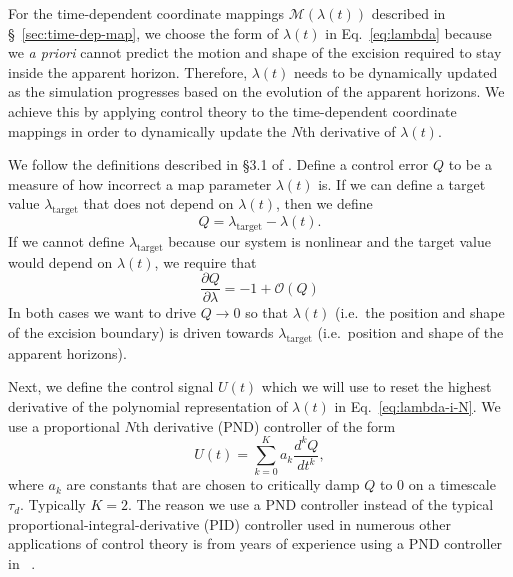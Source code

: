 \begin{bibunit}[unsrtnat]
For the time-dependent coordinate mappings $\mathcal{M}(\lambda(t))$ described
in \S~\ref{sec:time-dep-map}, we choose the form of $\lambda(t)$ in
Eq.~\eqref{eq:lambda} because we \textit{a priori} cannot predict the motion and
shape of the excision required to stay inside the apparent horizon. Therefore,
$\lambda(t)$ needs to be dynamically updated as the simulation progresses based
on the evolution of the apparent horizons. We achieve this by applying control
theory to the time-dependent coordinate mappings in order to dynamically update
the $N$th derivative of $\lambda(t)$.

We follow the definitions described in \S 3.1 of \cite{Hemberger:2012jz}. Define
a control error $Q$ to be a measure of how incorrect a map parameter
$\lambda(t)$ is.
If we can define a target value $\lambda_{\textrm{target}}$ that
does not depend on $\lambda(t)$, then we define
\begin{equation}
  \label{eq:control-error-linear}
  Q = \lambda_{\textrm{target}} - \lambda(t).
\end{equation}
If we cannot define $\lambda_{\textrm{target}}$ because our system is nonlinear
and the target value would depend on $\lambda(t)$, we require that
\begin{equation}
  \label{eq:control-error-nonlinear}
  \frac{\partial Q}{\partial \lambda} = -1 + \mathcal{O}(Q)
\end{equation}
In both cases we want to drive $Q\rightarrow 0$ so that $\lambda(t)$ (i.e.~the
position and shape of the excision boundary) is driven towards
$\lambda_\textrm{target}$ (i.e.~position and shape of the apparent horizons).

Next, we define the control signal $U(t)$ which we will use to reset the highest
derivative of the polynomial representation of $\lambda(t)$ in
Eq.~\eqref{eq:lambda-i-N}. We use a proportional $N$th derivative (PND)
controller of the form
\begin{equation}
  \label{eq:control-signal}
  U(t) = \sum_{k=0}^{K} a_{k}\frac{d^{k}Q}{dt^{k}},
\end{equation}
where $a_{k}$ are constants that are chosen to critically damp $Q$ to 0 on a
timescale $\tau_{d}$. Typically $K = 2$. The reason we use a PND controller
instead of the typical proportional-integral-derivative (PID) controller used in
numerous other applications of control theory is from years of experience
using a PND controller in \spec~\cite{Hemberger:2012jz}.


\end{bibunit}
